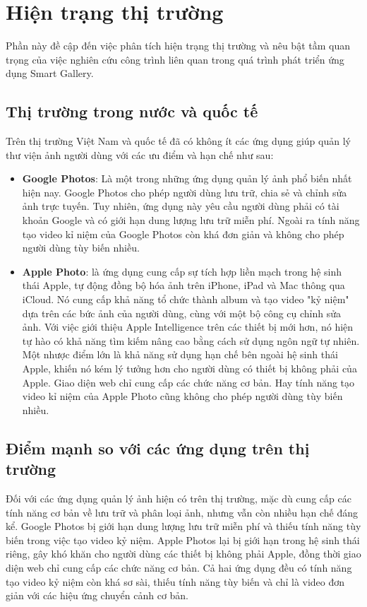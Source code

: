 \section{Hiện trạng thị trường} 
Phần này đề cập đến việc phân tích hiện trạng thị trường và nêu bật tầm quan trọng của việc nghiên cứu công trình liên quan trong quá trình phát triển ứng dụng Smart Gallery.
\subsection{Thị trường trong nước và quốc tế}
Trên thị trường Việt Nam và quốc tế đã có không ít các ứng dụng giúp quản lý thư viện ảnh người dùng với các ưu điểm và hạn chế như sau:
\begin{itemize}
    \item \textbf{Google Photos}: Là một trong những ứng dụng quản lý ảnh phổ biến nhất hiện nay. Google Photos cho phép người dùng lưu trữ, chia sẻ và chỉnh sửa ảnh trực tuyến. Tuy nhiên, ứng dụng này yêu cầu người dùng phải có tài khoản Google và có giới hạn dung lượng lưu trữ miễn phí. Ngoài ra tính năng tạo video kỉ niệm của Google Photos còn khá đơn giản và không cho phép người dùng tùy biến nhiều.
    \item \textbf{Apple Photo}: là ứng dụng cung cấp sự tích hợp liền mạch trong hệ sinh thái Apple, tự động đồng bộ hóa ảnh trên iPhone, iPad và Mac thông qua iCloud. Nó cung cấp khả năng tổ chức thành album và tạo video "kỷ niệm" dựa trên các bức ảnh của người dùng, cùng với một bộ công cụ chỉnh sửa ảnh. Với việc giới thiệu Apple Intelligence trên các thiết bị mới hơn, nó hiện tự hào có khả năng tìm kiếm nâng cao bằng cách sử dụng ngôn ngữ tự nhiên. Một nhược điểm lớn là khả năng sử dụng hạn chế bên ngoài hệ sinh thái Apple, khiến nó kém lý tưởng hơn cho người dùng có thiết bị không phải của Apple. Giao diện web chỉ cung cấp các chức năng cơ bản. Hay tính năng tạo video kỉ niệm của Apple Photo cũng không cho phép người dùng tùy biến nhiều.
\end{itemize}

\subsection{Điểm mạnh so với các ứng dụng trên thị trường}
Đối với các ứng dụng quản lý ảnh hiện có trên thị trường, mặc dù cung cấp các tính năng cơ bản về lưu trữ và phân loại ảnh, nhưng vẫn còn nhiều hạn chế đáng kể. Google Photos bị giới hạn dung lượng lưu trữ miễn phí và thiếu tính năng tùy biến trong việc tạo video kỷ niệm. Apple Photos lại bị giới hạn trong hệ sinh thái riêng, gây khó khăn cho người dùng các thiết bị không phải Apple, đồng thời giao diện web chỉ cung cấp các chức năng cơ bản. Cả hai ứng dụng đều có tính năng tạo video kỷ niệm còn khá sơ sài, thiếu tính năng tùy biến và chỉ là video đơn giản với các hiệu ứng chuyển cảnh cơ bản.

